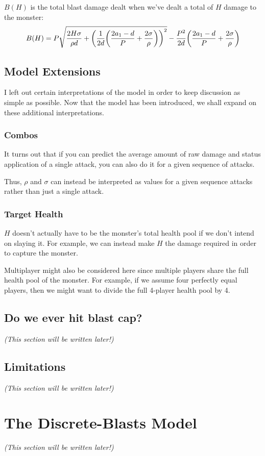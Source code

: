 \documentclass{article}
\begin{document}
$B(H)$ is the total blast damage dealt when we've dealt a total of $H$ damage to the monster:
\begin{equation}
    B (H)
        = P \sqrt{
            \frac{2 H \sigma}{\rho d}
            + \parens*{\frac{1}{2d} \parens*{\frac{2 a_1 - d}{P} + \frac{2 \sigma}{\rho}}}^2
        }
        - \frac{P^2}{2d} \parens*{\frac{2 a_1 - d}{P} + \frac{2 \sigma}{\rho}}
\end{equation}


\subsection{Model Extensions}%
\label{sub:model_extensions}

I left out certain interpretations of the model in order to keep discussion as simple as possible. Now that the model has been introduced, we shall expand on these additional interpretations.

\subsubsection{Combos}%
\label{ssub:combos}

It turns out that if you can predict the average amount of raw damage and status application of a single attack, you can also do it for a given sequence of attacks.

Thus, $\rho$ and $\sigma$ can instead be interpreted as values for a given sequence attacks rather than just a single attack.

\subsubsection{Target Health}%
\label{ssub:target_health}

$H$ doesn't actually have to be the monster's total health pool if we don't intend on slaying it. For example, we can instead make $H$ the damage required in order to capture the monster.

Multiplayer might also be considered here since multiple players share the full health pool of the monster. For example, if we assume four perfectly equal players, then we might want to divide the full 4-player health pool by 4.


\subsection{Do we ever hit blast cap?}%
\label{sub:do_we_ever_hit_blast_cap_}

\textit{(This section will be written later!)}


\subsection{Limitations}%
\label{sub:limitations}

\textit{(This section will be written later!)}


\newpage


\section{The Discrete-Blasts Model}%
\label{sec:the_discrete_blasts_model}

\textit{(This section will be written later!)}
\end{document}
